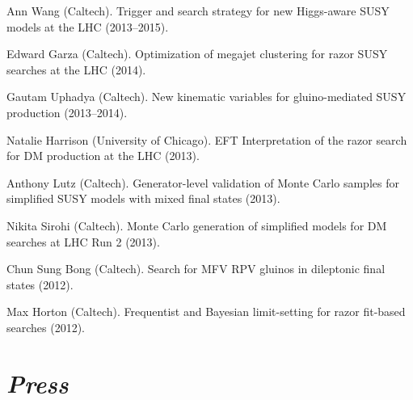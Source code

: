 \documentclass[11pt]{res}
\newcommand{\MarginText}[1]{\section{\textit{#1}}}
\begin{document}
\begin{resume}
\begin{itemize}
{    \item Ann Wang (Caltech). Trigger and search strategy for new Higgs-aware SUSY models at the LHC ({2013--2015}).
    \item Edward Garza (Caltech). Optimization of megajet clustering for razor SUSY searches at the LHC ({2014}).
    \item Gautam Uphadya (Caltech). New kinematic variables for gluino-mediated SUSY production ({2013--2014}).
    \item Natalie Harrison (University of Chicago). EFT Interpretation of the razor search for DM production at the LHC ({2013}).
    \item Anthony Lutz (Caltech). Generator-level validation of Monte Carlo samples for simplified SUSY models with mixed final states ({2013}).
    \item Nikita Sirohi (Caltech). Monte Carlo generation of simplified models for DM searches at LHC Run 2 ({2013}).
    \item Chun Sung Bong (Caltech). Search for MFV RPV gluinos in dileptonic final states ({2012}).
    \item Max Horton (Caltech). Frequentist and Bayesian limit-setting for razor fit-based searches ({2012}).
          }{}
  \end{itemize}

  \MarginText{Press}


\end{resume}
\end{document}
